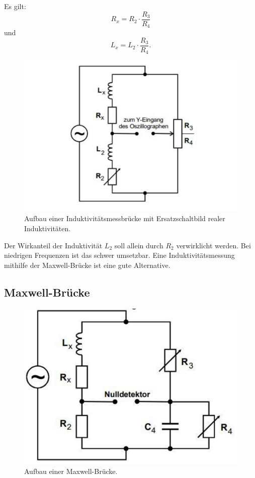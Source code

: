Es gilt:
\begin{equation} \label{eqn:induktivität_r}
    R_x = R_2 \cdot \frac{R_3}{R_4}
\end{equation}
und
\begin{equation} \label{eqn:induktivität_l}
    L_x = L_2 \cdot \frac{R_3}{R_4} .
\end{equation}

\begin{figure}
    \centering
    \includegraphics[width=\textwidth]{InduBruecke.pdf}
    \caption{Aufbau einer Induktivitätsmessbrücke mit Ersatzschaltbild realer Induktivitäten. \cite{anleitung}}
    \label{fig:indubruecke}
\end{figure}

Der Wirkanteil der Induktivität $L_2$ soll allein durch $R_2$ verwirklicht werden.
Bei niedrigen Frequenzen ist das schwer umsetzbar.
Eine Induktivitätsmessung mithilfe der Maxwell-Brücke ist eine gute Alternative.

\subsection{Maxwell-Brücke}

\begin{figure}
    \centering
    \includegraphics[width=\textwidth]{MaxwellBruecke.pdf}
    \caption{Aufbau einer Maxwell-Brücke. \cite{anleitung}}
    \label{fig:Maxwell}
\end{figure}

